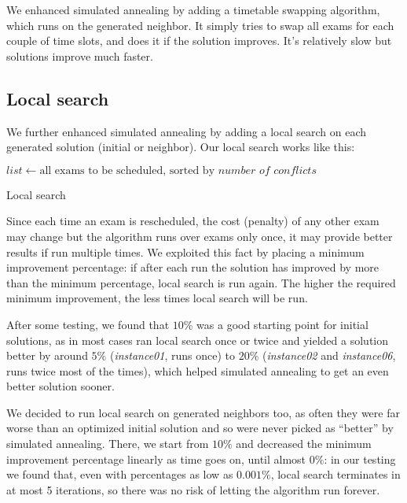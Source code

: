 \documentclass[11pt, a4paper, leqno]{article}
\begin{document}
	We enhanced simulated annealing by adding a timetable swapping algorithm, which runs on the generated neighbor. It simply tries to swap all exams for each couple of time slots, and does it if the solution improves. It's relatively slow but solutions improve much faster.
	
	\subsection{Local search}
	\label{local}
	
	We further enhanced simulated annealing by adding a local search on each generated solution (initial or neighbor). Our local search works like this:
	
	\begin{algorithm}[H]
		$list \gets \text{all exams to be scheduled, sorted by }\textit{number of conflicts}$\;
		\caption{Local search}
	\end{algorithm}
	
	Since each time an exam is rescheduled, the cost (penalty) of any other exam may change but the algorithm runs over exams only once, it may provide better results if run multiple times. We exploited this fact by placing a minimum improvement percentage: if after each run the solution has improved by more than the minimum percentage, local search is run again. The higher the required minimum improvement, the less times local search will be run.
	
	After some testing, we found that $10\%$ was a good starting point for initial solutions, as in most cases ran local search once or twice and yielded a solution better by around $5\%$ (\textit{instance01}, runs once) to $20\%$ (\textit{instance02} and \textit{instance06}, runs twice most of the times), which helped simulated annealing to get an even better solution sooner.
	
	We decided to run local search on generated neighbors too, as often they were far worse than an optimized initial solution and so were never picked as ``better'' by simulated annealing. There, we start from $10\%$ and decreased the minimum improvement percentage linearly as time goes on, until almost $0\%$: in our testing we found that, even with percentages as low as $0.001\%$, local search terminates in at most 5 iterations, so there was no risk of letting the algorithm run forever.
	
\end{document}
